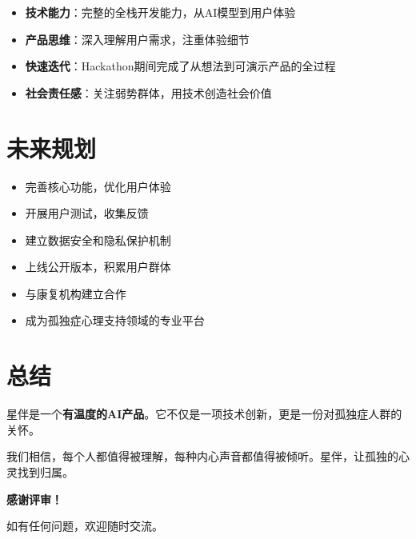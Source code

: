\documentclass[12pt,a4paper]{article}
\begin{document}
\begin{itemize}[leftmargin=*]
    \item \textbf{技术能力}：完整的全栈开发能力，从AI模型到用户体验
    \item \textbf{产品思维}：深入理解用户需求，注重体验细节
    \item \textbf{快速迭代}：Hackathon期间完成了从想法到可演示产品的全过程
    \item \textbf{社会责任感}：关注弱势群体，用技术创造社会价值
\end{itemize}

\section{未来规划}

\begin{itemize}[leftmargin=*]
    \item 完善核心功能，优化用户体验
    \item 开展用户测试，收集反馈
    \item 建立数据安全和隐私保护机制
    \item 上线公开版本，积累用户群体
    \item 与康复机构建立合作
    \item 成为孤独症心理支持领域的专业平台
\end{itemize}

\section{总结}

星伴是一个\textbf{有温度的AI产品}。它不仅是一项技术创新，更是一份对孤独症人群的关怀。

我们相信，每个人都值得被理解，每种内心声音都值得被倾听。星伴，让孤独的心灵找到归属。

\vspace{2em}

\begin{center}
\Large\textbf{感谢评审！}

\vspace{1em}
\normalsize
如有任何问题，欢迎随时交流。
\end{center}
\end{document}
